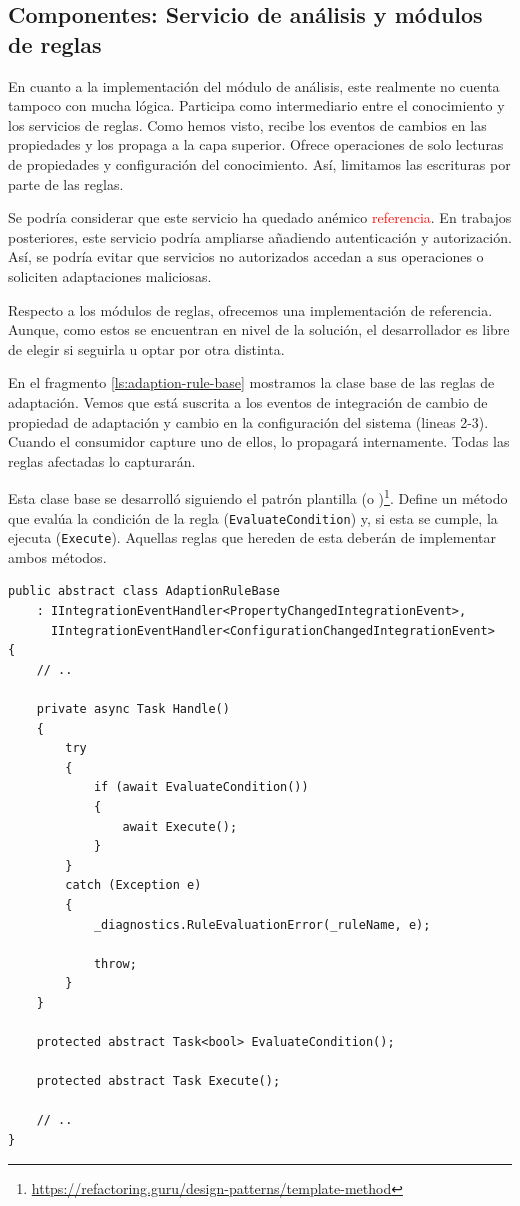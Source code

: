 \subsection{Componentes: Servicio de análisis y módulos de reglas}

En cuanto a la implementación del módulo de análisis, este realmente no cuenta tampoco con mucha lógica. Participa como intermediario entre el conocimiento y los servicios de reglas. Como hemos visto, recibe los eventos de cambios en las propiedades y los propaga a la capa superior. Ofrece operaciones de solo lecturas de propiedades y configuración del conocimiento. Así, limitamos las escrituras por parte de las reglas.

Se podría considerar que este servicio ha quedado anémico \textcolor{red}{referencia}. En trabajos posteriores, este servicio podría ampliarse añadiendo autenticación y autorización. Así, se podría evitar que servicios no autorizados accedan a sus operaciones o soliciten adaptaciones maliciosas.

Respecto a los módulos de reglas, ofrecemos una implementación de referencia. Aunque, como estos se encuentran en nivel de la solución, el desarrollador es libre de elegir si seguirla u optar por otra distinta.

En el fragmento \ref{ls:adaption-rule-base} mostramos la clase base de las reglas de adaptación. Vemos que está suscrita a los eventos de integración de cambio de propiedad de adaptación y cambio en la configuración del sistema (lineas 2-3). Cuando el consumidor capture uno de ellos, lo propagará internamente. Todas las reglas afectadas lo capturarán.

Esta clase base se desarrolló siguiendo el patrón plantilla (o )\footnote{\url{https://refactoring.guru/design-patterns/template-method}}. Define un método que evalúa la condición de la regla (\texttt{EvaluateCondition}) y, si esta se cumple, la ejecuta (\texttt{Execute}). Aquellas reglas que hereden de esta deberán de implementar ambos métodos.

\begin{lstlisting}[language={[Sharp]C},caption={Clase base para implementar reglas de adaptación. Se evalúa la condición, y si esta se cumple, se ejecuta.},captionpos=b, label=ls:adaption-rule-base]
public abstract class AdaptionRuleBase
    : IIntegrationEventHandler<PropertyChangedIntegrationEvent>,
      IIntegrationEventHandler<ConfigurationChangedIntegrationEvent>
{
    // ..

    private async Task Handle()
    {
        try
        {
            if (await EvaluateCondition())
            {
                await Execute();
            }
        }
        catch (Exception e)
        {
            _diagnostics.RuleEvaluationError(_ruleName, e);

            throw;
        }
    }

    protected abstract Task<bool> EvaluateCondition();

    protected abstract Task Execute();

    // ..
}
\end{lstlisting}

